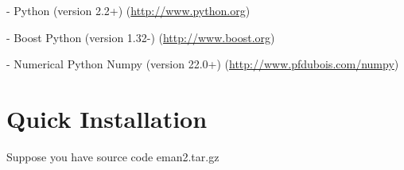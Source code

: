     - Python (version 2.2+)     (\href{http://www.python.org}{http://www.python.org})
    
    - Boost Python (version 1.32-)	(\href{http://www.boost.org}{http://www.boost.org})
    
    - Numerical Python Numpy (version 22.0+)
                                        (\href{http://www.pfdubois.com/numpy}{http://www.pfdubois.com/numpy})



\section{Quick Installation} 
\label{QUICK-INSTALLATION} 

 Suppose you have source code eman2.tar.gz

